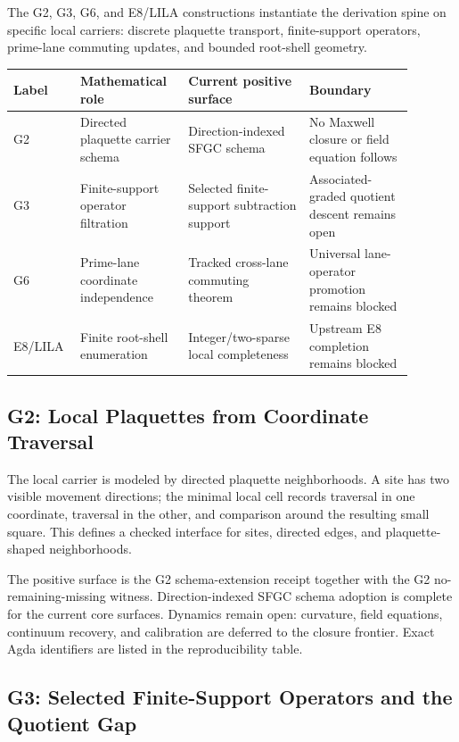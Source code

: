 \documentclass[11pt]{article}
\theoremstyle{definition}
\theoremstyle{plain}
\theoremstyle{remark}
\begin{document}
The G2, G3, G6, and E8/LILA constructions instantiate the derivation spine on
specific local carriers: discrete plaquette transport, finite-support
operators, prime-lane commuting updates, and bounded root-shell geometry.

\begin{longtable}{p{0.12\linewidth}p{0.25\linewidth}p{0.28\linewidth}p{0.24\linewidth}}
\toprule
Label & Mathematical role & Current positive surface & Boundary \\
\midrule
G2 & Directed plaquette carrier schema & Direction-indexed SFGC schema & No Maxwell closure or field equation follows \\
G3 & Finite-support operator filtration & Selected finite-support subtraction support & Associated-graded quotient descent remains open \\
G6 & Prime-lane coordinate independence & Tracked cross-lane commuting theorem & Universal lane-operator promotion remains blocked \\
E8/LILA & Finite root-shell enumeration & Integer/two-sparse local completeness & Upstream E8 completion remains blocked \\
\bottomrule
\end{longtable}

\subsection{G2: Local Plaquettes from Coordinate Traversal}

The local carrier is modeled by directed plaquette neighborhoods. A site has
two visible movement directions; the minimal local cell records traversal in
one coordinate, traversal in the other, and comparison around the resulting
small square. This defines a checked interface for sites, directed edges, and
plaquette-shaped neighborhoods.

The positive surface is the G2 schema-extension receipt together with the G2
no-remaining-missing witness. Direction-indexed SFGC schema adoption is complete
for the current core surfaces. Dynamics remain open: curvature, field
equations, continuum recovery, and calibration are deferred to the closure
frontier. Exact Agda identifiers are listed in the reproducibility table.

\subsection{G3: Selected Finite-Support Operators and the Quotient Gap}
\end{document}
